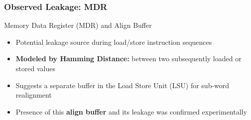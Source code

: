 \begin{frame}
    \frametitle{Observed Leakage: MDR}
    \begin{block}{Memory Data Register (MDR) and Align Buffer}
        \begin{itemize}
            \item Potential leakage source during load/store instruction sequences
            \item \textbf{Modeled by Hamming Distance:} between two subsequently loaded or stored values
            \item Suggests a separate buffer in the Load Store Unit (LSU) for sub-word realignment
            \item Presence of this \textbf{align buffer} and its leakage was confirmed experimentally
        \end{itemize}
    \end{block}
\end{frame}

